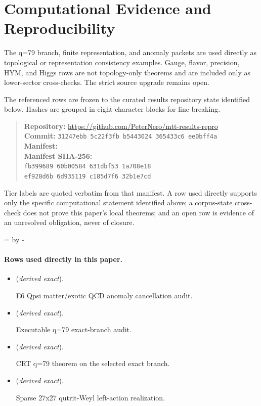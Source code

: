 \documentclass[11pt]{article}
\theoremstyle{plain}
\theoremstyle{definition}
\theoremstyle{remark}
\begin{document}
\section*{Computational Evidence and Reproducibility}
The q=79 branch, finite representation, and anomaly packets are used directly as topological or representation consistency examples. Gauge, flavor, precision, HYM, and Higgs rows are not topology-only theorems and are included only as lower-sector cross-checks. The strict source upgrade remains open.

The referenced rows are frozen to the curated results repository state identified below. Hashes are grouped in eight-character blocks for line breaking.
\begin{quote}\small
\textbf{Repository:} \url{https://github.com/PeterNero/mtt-results-repro}\\
\textbf{Commit:} \texttt{31247ebb 5c22f3fb b5443024 365433c6 ee0bff4a}\\
\textbf{Manifest:} \\
\textbf{Manifest SHA-256:}\\
\texttt{fb399689 60b00584 631dbf53 1a708e18}\\
\texttt{ef928d6b 6d935119 c185d7f6 32b1e7cd}
\end{quote}

Tier labels are quoted verbatim from that manifest. A row used directly supports only the specific computational statement identified above; a corpus-state cross-check does not prove this paper's local theorems; and an open row is evidence of an unresolved obligation, never of closure.

\par\begingroup{}=\pagegoal\advance{} by -\pagetotal\ifdim\dimen0<7\baselineskip\newpage\fi\endgroup
\paragraph{Rows used directly in this paper.}
\begin{itemize}
\setlength{\itemsep}{0.25em}
\item {} (\emph{derived exact}).\par E6 Qpsi matter/exotic QCD anomaly cancellation audit.
\item {} (\emph{derived exact}).\par Executable q=79 exact-branch audit.
\item {} (\emph{derived exact}).\par CRT q=79 theorem on the selected exact branch.
\item {} (\emph{derived exact}).\par Sparse 27x27 qutrit-Weyl left-action realization.
\end{itemize}
\end{document}

